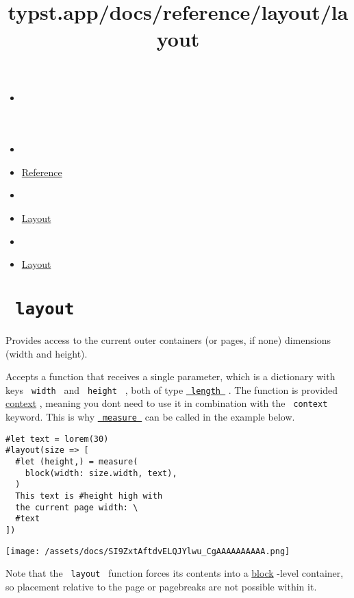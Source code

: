 \title{typst.app/docs/reference/layout/layout}

\begin{itemize}
\tightlist
\item
  \href{/docs}{}
\item
  
\item
  \href{/docs/reference/}{Reference}
\item
  
\item
  \href{/docs/reference/layout/}{Layout}
\item
  
\item
  \href{/docs/reference/layout/layout/}{Layout}
\end{itemize}

\section{\texorpdfstring{\texttt{\ layout\ }}{ layout }}\label{summary}

Provides access to the current outer container\textquotesingle s (or
page\textquotesingle s, if none) dimensions (width and height).

Accepts a function that receives a single parameter, which is a
dictionary with keys \texttt{\ width\ } and \texttt{\ height\ } , both
of type \href{/docs/reference/layout/length/}{\texttt{\ length\ }} . The
function is provided \href{/docs/reference/context/}{context} , meaning
you don\textquotesingle t need to use it in combination with the
\texttt{\ context\ } keyword. This is why
\href{/docs/reference/layout/measure/}{\texttt{\ measure\ }} can be
called in the example below.

\begin{verbatim}
#let text = lorem(30)
#layout(size => [
  #let (height,) = measure(
    block(width: size.width, text),
  )
  This text is #height high with
  the current page width: \
  #text
])
\end{verbatim}

\texttt{[image: /assets/docs/SI9ZxtAftdvELQJYlwu\_CgAAAAAAAAAA.png]}

Note that the \texttt{\ layout\ } function forces its contents into a
\href{/docs/reference/layout/block/}{block} -level container, so
placement relative to the page or pagebreaks are not possible within it.

